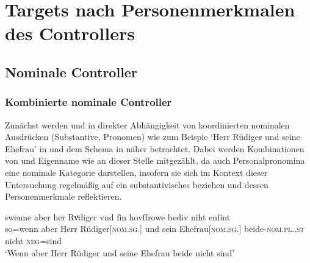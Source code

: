 
\section{Targets nach Personenmerkmalen des Controllers}
\label{sec:caotargpers}

\subsection{Nominale Controller}
\subsubsection{Kombinierte nominale Controller}
\label{subsubsec:perscombsgnp}

Zunächst werden  und  in direkter Abhängigkeit von
koordinierten nominalen Ausdrücken (Substantive, Pronomen) wie
zum Beispie  `Herr Rüdiger und seine
Ehefrau' in  und dem Schema in
 näher betrachtet. Dabei werden Kombinationen von
 und Eigenname wie  an dieser Stelle
mitgezählt, da auch Personalpronomina eine nominale Kategorie darstellen,
insofern sie sich im Kontext dieser Untersuchung regelmäßig auf ein
substantivisches  beziehen und dessen Personenmerkmale
reflektieren.

\begin{exe}
\ex \label{ex:beid2coordncao1}
		\gll swenne aber her Rvͦdiger vnd ſin
			hovſfrowe bediv niht enſint\\
			so=wenn aber Herr Rüdiger[\textsc{nom.sg.\MascM}] und sein
			Ehefrau[\textsc{nom.sg.\FemF}] beide-\textsc{nom.pl.\NeutMF.st} nicht
			\textsc{neg}=sind\\
			\trans `Wenn aber Herr Rüdiger und seine Ehefrau
				beide nicht  sind'
				\parencites(Nr.~3262, Regensburg, 1299)[425,13--14]{cao4}
\end{exe}

